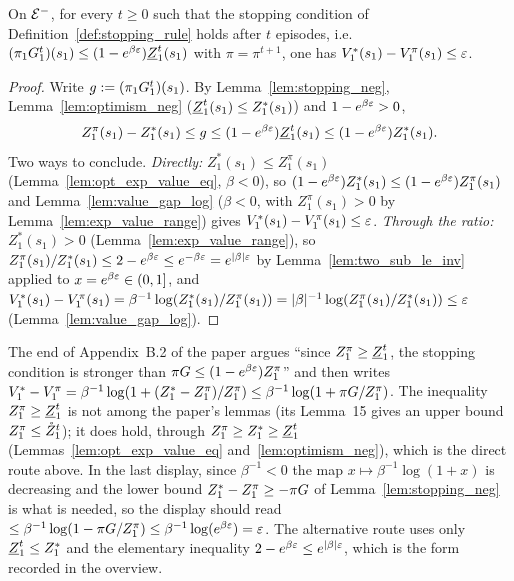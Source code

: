\begin{lemma}\label{lem:pac_at_stopping_neg}
\leanok
{}
On $\mathcal{E}^-$, for every $t \ge 0$ such that the stopping condition of
Definition~\ref{def:stopping_rule} holds after $t$ episodes, i.e.\
$(\pi_1G_1^t)(s_1) \le (1 - e^{\beta\varepsilon})\underline{Z}_1^t(s_1)$ with $\pi = \pi^{t+1}$, one has
$V^*_1(s_1) - V^\pi_1(s_1) \le \varepsilon$.
\end{lemma}

\begin{proof}
\leanok
Write $g := (\pi_1G_1^t)(s_1)$. By Lemma~\ref{lem:stopping_neg}, Lemma~\ref{lem:optimism_neg}
($\underline{Z}_1^t(s_1) \le Z^*_1(s_1)$) and $1 - e^{\beta\varepsilon} > 0$,
\[
  Z^\pi_1(s_1) - Z^*_1(s_1) \le g \le (1 - e^{\beta\varepsilon})\underline{Z}_1^t(s_1) \le (1 - e^{\beta\varepsilon})Z^*_1(s_1) .
\]
Two ways to conclude. \emph{Directly:} $Z^*_1(s_1) \le Z^\pi_1(s_1)$ (Lemma~\ref{lem:opt_exp_value_eq},
$\beta < 0$), so $(1 - e^{\beta\varepsilon})Z^*_1(s_1) \le (1 - e^{\beta\varepsilon})Z^\pi_1(s_1)$ and
Lemma~\ref{lem:value_gap_log} ($\beta < 0$, with $Z^\pi_1(s_1) > 0$ by Lemma~\ref{lem:exp_value_range})
gives $V^*_1(s_1) - V^\pi_1(s_1) \le \varepsilon$. \emph{Through the ratio:} $Z^*_1(s_1) > 0$
(Lemma~\ref{lem:exp_value_range}), so $Z^\pi_1(s_1)/Z^*_1(s_1) \le 2 - e^{\beta\varepsilon} \le e^{-\beta\varepsilon} = e^{|\beta|\varepsilon}$
by Lemma~\ref{lem:two_sub_le_inv} applied to $x = e^{\beta\varepsilon} \in (0, 1]$, and
$V^*_1(s_1) - V^\pi_1(s_1) = \beta^{-1}\log(Z^*_1(s_1)/Z^\pi_1(s_1)) = |\beta|^{-1}\log(Z^\pi_1(s_1)/Z^*_1(s_1)) \le \varepsilon$
(Lemma~\ref{lem:value_gap_log}).
\end{proof}

\begin{remark}\label{rem:neg_stopping}
\uses{lem:pac_at_stopping_neg}
The end of Appendix~B.2 of the paper argues ``since $Z^\pi_1 \ge \underline{Z}_1^t$, the stopping condition is
stronger than $\pi G \le (1 - e^{\beta\varepsilon})Z^\pi_1$'' and then writes
$V^*_1 - V^\pi_1 = \beta^{-1}\log(1 + (Z^*_1 - Z^\pi_1)/Z^\pi_1) \le \beta^{-1}\log(1 + \pi G/Z^\pi_1)$. The
inequality $Z^\pi_1 \ge \underline{Z}_1^t$ is not among the paper's lemmas (its Lemma~15 gives an upper
bound $Z^\pi_1 \le \mathring{Z}_1^t$); it does hold, through $Z^\pi_1 \ge Z^*_1 \ge \underline{Z}_1^t$
(Lemmas~\ref{lem:opt_exp_value_eq} and~\ref{lem:optimism_neg}), which is the direct route above. In
the last display, since $\beta^{-1} < 0$ the map $x \mapsto \beta^{-1}\log(1 + x)$ is decreasing and the
lower bound $Z^*_1 - Z^\pi_1 \ge -\pi G$ of Lemma~\ref{lem:stopping_neg} is what is needed, so the
display should read $\le \beta^{-1}\log(1 - \pi G/Z^\pi_1) \le \beta^{-1}\log(e^{\beta\varepsilon}) = \varepsilon$. The
alternative route uses only $\underline{Z}_1^t \le Z^*_1$ and the elementary inequality
$2 - e^{\beta\varepsilon} \le e^{|\beta|\varepsilon}$, which is the form recorded in the overview.
\end{remark}

